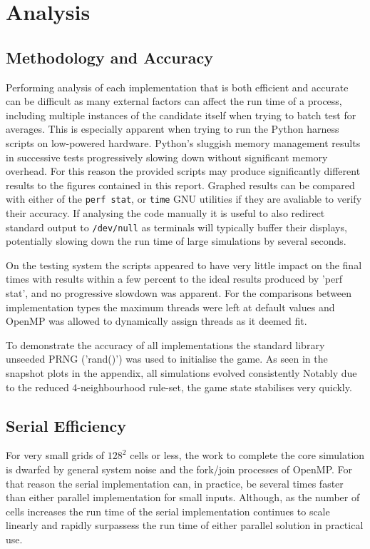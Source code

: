 \documentclass[]{article}
\begin{document}
\section{Analysis}
\subsection{Methodology and Accuracy}
Performing analysis of each implementation that is both efficient and accurate can be difficult as many external factors can affect the run time of a process, including multiple instances of the candidate itself when trying to batch test for averages. This is especially apparent when trying to run the Python harness scripts on low-powered hardware. Python's sluggish memory management results in successive tests progressively slowing down without significant memory overhead. For this reason the provided scripts may produce significantly different results to the figures contained in this report. Graphed results can be compared with either of the \texttt{perf stat}, or \texttt{time} GNU utilities if they are avaliable to verify their accuracy. If analysing the code manually it is useful to also redirect standard output to \texttt{/dev/null} as terminals will typically buffer their displays, potentially slowing down the run time of large simulations by several seconds.

On the testing system the scripts appeared to have very little impact on the final times with results within a few percent to the ideal results produced by 'perf stat', and no progressive slowdown was apparent. For the comparisons between implementation types the maximum threads were left at default values and OpenMP was allowed to dynamically assign threads as it deemed fit.

To demonstrate the accuracy of all implementations the standard library unseeded PRNG ('rand()') was used to initialise the game. As seen in the snapshot plots in the appendix, all simulations evolved consistently Notably due to the reduced 4-neighbourhood rule-set, the game state stabilises very quickly.

\subsection{Serial Efficiency}
For very small grids of $128^2$ cells or less, the work to complete the core simulation is dwarfed by general system noise and the fork/join processes of OpenMP. For that reason the serial implementation can, in practice, be several times faster than either parallel implementation for small inputs. Although, as the number of cells increases the run time of the serial implementation continues to scale linearly and rapidly surpassess the run time of either parallel solution in practical use.
\end{document}
